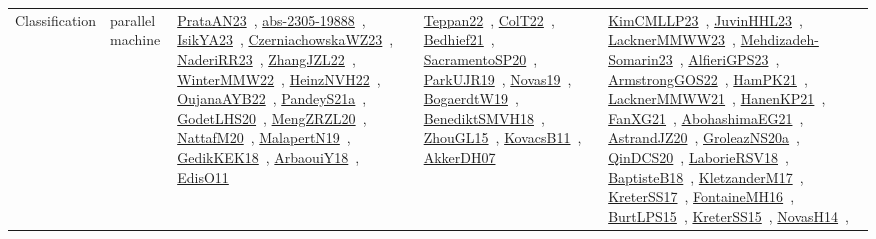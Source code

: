 {\begin{longtable}{lp{3cm}>{\raggedright\arraybackslash}p{6cm}>{\raggedright\arraybackslash}p{6cm}>{\raggedright\arraybackslash}p{8cm}}
Classification & parallel machine & \href{articles/PrataAN23.pdf}{PrataAN23}~\cite{PrataAN23}, \href{articles/abs-2305-19888.pdf}{abs-2305-19888}~\cite{abs-2305-19888}, \href{articles/IsikYA23.pdf}{IsikYA23}~\cite{IsikYA23}, \href{articles/CzerniachowskaWZ23.pdf}{CzerniachowskaWZ23}~\cite{CzerniachowskaWZ23}, \href{articles/NaderiRR23.pdf}{NaderiRR23}~\cite{NaderiRR23}, \href{papers/ZhangJZL22.pdf}{ZhangJZL22}~\cite{ZhangJZL22}, \href{papers/WinterMMW22.pdf}{WinterMMW22}~\cite{WinterMMW22}, \href{articles/HeinzNVH22.pdf}{HeinzNVH22}~\cite{HeinzNVH22}, \href{papers/OujanaAYB22.pdf}{OujanaAYB22}~\cite{OujanaAYB22}, \href{articles/PandeyS21a.pdf}{PandeyS21a}~\cite{PandeyS21a}, \href{papers/GodetLHS20.pdf}{GodetLHS20}~\cite{GodetLHS20}, \href{articles/MengZRZL20.pdf}{MengZRZL20}~\cite{MengZRZL20}, \href{papers/NattafM20.pdf}{NattafM20}~\cite{NattafM20}, \href{papers/MalapertN19.pdf}{MalapertN19}~\cite{MalapertN19}, \href{articles/GedikKEK18.pdf}{GedikKEK18}~\cite{GedikKEK18}, \href{papers/ArbaouiY18.pdf}{ArbaouiY18}~\cite{ArbaouiY18}, \href{papers/EdisO11.pdf}{EdisO11}~\cite{EdisO11} & \href{papers/Teppan22.pdf}{Teppan22}~\cite{Teppan22}, \href{articles/ColT22.pdf}{ColT22}~\cite{ColT22}, \href{articles/Bedhief21.pdf}{Bedhief21}~\cite{Bedhief21}, \href{articles/SacramentoSP20.pdf}{SacramentoSP20}~\cite{SacramentoSP20}, \href{papers/ParkUJR19.pdf}{ParkUJR19}~\cite{ParkUJR19}, \href{articles/Novas19.pdf}{Novas19}~\cite{Novas19}, \href{papers/BogaerdtW19.pdf}{BogaerdtW19}~\cite{BogaerdtW19}, \href{papers/BenediktSMVH18.pdf}{BenediktSMVH18}~\cite{BenediktSMVH18}, \href{papers/ZhouGL15.pdf}{ZhouGL15}~\cite{ZhouGL15}, \href{articles/KovacsB11.pdf}{KovacsB11}~\cite{KovacsB11}, \href{papers/AkkerDH07.pdf}{AkkerDH07}~\cite{AkkerDH07} & \href{papers/KimCMLLP23.pdf}{KimCMLLP23}~\cite{KimCMLLP23}, \href{papers/JuvinHHL23.pdf}{JuvinHHL23}~\cite{JuvinHHL23}, \href{articles/LacknerMMWW23.pdf}{LacknerMMWW23}~\cite{LacknerMMWW23}, \href{papers/Mehdizadeh-Somarin23.pdf}{Mehdizadeh-Somarin23}~\cite{Mehdizadeh-Somarin23}, \href{articles/AlfieriGPS23.pdf}{AlfieriGPS23}~\cite{AlfieriGPS23}, \href{papers/ArmstrongGOS22.pdf}{ArmstrongGOS22}~\cite{ArmstrongGOS22}, \href{articles/HamPK21.pdf}{HamPK21}~\cite{HamPK21}, \href{papers/LacknerMMWW21.pdf}{LacknerMMWW21}~\cite{LacknerMMWW21}, \href{papers/HanenKP21.pdf}{HanenKP21}~\cite{HanenKP21}, \href{articles/FanXG21.pdf}{FanXG21}~\cite{FanXG21}, \href{articles/AbohashimaEG21.pdf}{AbohashimaEG21}~\cite{AbohashimaEG21}, \href{articles/AstrandJZ20.pdf}{AstrandJZ20}~\cite{AstrandJZ20}, \href{papers/GroleazNS20a.pdf}{GroleazNS20a}~\cite{GroleazNS20a}, \href{articles/QinDCS20.pdf}{QinDCS20}~\cite{QinDCS20}, \href{articles/LaborieRSV18.pdf}{LaborieRSV18}~\cite{LaborieRSV18}, \href{articles/BaptisteB18.pdf}{BaptisteB18}~\cite{BaptisteB18}, \href{papers/KletzanderM17.pdf}{KletzanderM17}~\cite{KletzanderM17}, \href{articles/KreterSS17.pdf}{KreterSS17}~\cite{KreterSS17}, \href{papers/FontaineMH16.pdf}{FontaineMH16}~\cite{FontaineMH16}, \href{papers/BurtLPS15.pdf}{BurtLPS15}~\cite{BurtLPS15}, \href{papers/KreterSS15.pdf}{KreterSS15}~\cite{KreterSS15}, \href{articles/NovasH14.pdf}{NovasH14}~\cite{NovasH14}, 
\end{longtable}}
